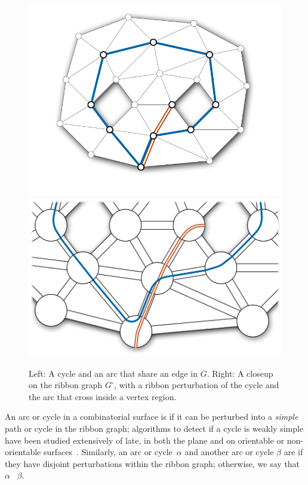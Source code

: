 \documentclass[letterpaper,review]{siamart190516}
\begin{document}
\begin{figure}[htb]
\centering
\includegraphics[scale=0.45]{Fig/pants-ribbon}\hfil
\includegraphics[scale=0.45]{Fig/pants-ribbon-2}
\caption{Left: A cycle and an arc that share an edge in $G$.  Right: A closeup on the ribbon graph $G^\square$, with a ribbon perturbation of the cycle and the arc that cross inside a vertex region.}
\label{F:ribbon}
\end{figure}

An arc or cycle in a combinatorial surface is  if it can be perturbed into a \emph{simple} path or cycle in the ribbon graph; algorithms to detect if a cycle is weakly simple have been studied extensively of late, in both the plane and on orientable or non-orientable surfaces~\cite{cex-dwsp-15,aaet-rwsp-17}.
Similarly, an arc or cycle~$\alpha$ and another arc or cycle $\beta$ are  if they have disjoint perturbations within the ribbon graph; otherwise, we say that $\alpha$ ~$\beta$.
\end{document}
